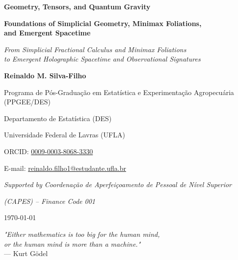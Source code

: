 \documentclass[11pt,a4paper,openright,twoside]{book}
\begin{document}
\frontmatter
\begin{titlepage}
    \centering
    \vspace*{2cm}
    
    {\Huge \textbf{Geometry, Tensors, and Quantum Gravity} \par}
    \vspace{0.6cm}
    {\LARGE \textbf{Foundations of Simplicial Geometry, Minimax Foliations,} \\ \textbf{and Emergent Spacetime} \par}
    \vspace{1cm}
    {\large \textit{From Simplicial Fractional Calculus and Minimax Foliations} \\ \textit{to Emergent Holographic Spacetime and Observational Signatures} \par}
    
    \vspace{3cm}
    
    {\Large \textbf{Reinaldo M. Silva-Filho} \par}
    \vspace{0.5cm}
    {\normalsize Programa de P\'os-Gradua\c{c}\~ao em Estat\'istica e Experimenta\c{c}\~ao Agropecu\'aria (PPGEE/DES) \par}
    {\normalsize Departamento de Estat\'istica (DES) \par}
    {\normalsize Universidade Federal de Lavras (UFLA) \par}
    
    \vspace{0.8cm}
    {\normalsize ORCID: \href{https://orcid.org/0009-0003-8068-3330}{0009-0003-8068-3330} \par}
    {\normalsize E-mail: \href{mailto:reinaldo.filho1@estudante.ufla.br}{reinaldo.filho1@estudante.ufla.br} \par}
    
    \vspace{1.5cm}
    {\normalsize \textit{Supported by Coordena\c{c}\~ao de Aperfei\c{c}oamento de Pessoal de N\'ivel Superior} \par}
    {\normalsize \textit{(CAPES) -- Finance Code 001} \par}
    
    \vfill
    {\large \today \par}
\end{titlepage}

\vspace*{0.2\textheight}
\begin{flushright}
\textit{"Either mathematics is too big for the human mind, \\
or the human mind is more than a machine."} \\
\vspace{0.2cm}
--- Kurt G\"odel
\end{flushright}
\end{document}
